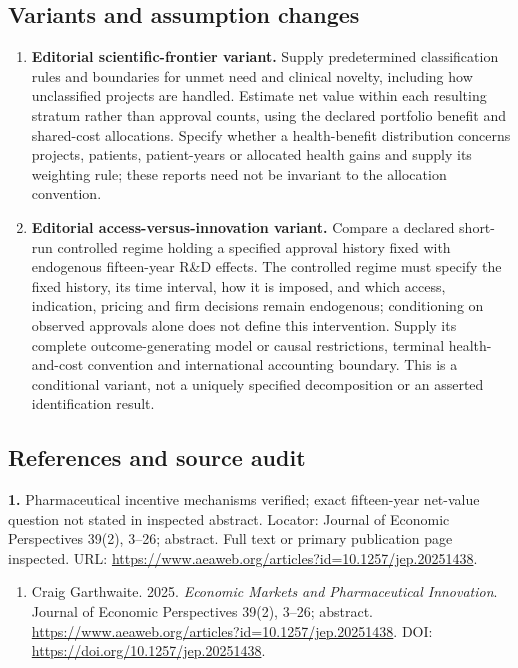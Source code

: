 \documentclass[11pt,a4paper]{article}
\begin{document}
\subsection*{Variants and assumption changes}
\begin{enumerate}
\item \textbf{Editorial scientific-frontier variant.} Supply predetermined classification rules and boundaries for unmet need and clinical novelty, including how unclassified projects are handled. Estimate net value within each resulting stratum rather than approval counts, using the declared portfolio benefit and shared-cost allocations. Specify whether a health-benefit distribution concerns projects, patients, patient-years or allocated health gains and supply its weighting rule; these reports need not be invariant to the allocation convention.
\item \textbf{Editorial access-versus-innovation variant.} Compare a declared short-run controlled regime holding a specified approval history fixed with endogenous fifteen-year R\&D effects. The controlled regime must specify the fixed history, its time interval, how it is imposed, and which access, indication, pricing and firm decisions remain endogenous; conditioning on observed approvals alone does not define this intervention. Supply its complete outcome-generating model or causal restrictions, terminal health-and-cost convention and international accounting boundary. This is a conditional variant, not a uniquely specified decomposition or an asserted identification result.
\end{enumerate}
\subsection*{References and source audit}
\textbf{1.} Pharmaceutical incentive mechanisms verified; exact fifteen-year net-value question not stated in inspected abstract. Locator: Journal of Economic Perspectives 39(2), 3–26; abstract. Full text or primary publication page inspected. URL: \url{https://www.aeaweb.org/articles?id=10.1257/jep.20251438}.
\begin{enumerate}\raggedright
\item\hypertarget{definitions:source:30007727:1}{} Craig Garthwaite. 2025. \emph{Economic Markets and Pharmaceutical Innovation}. Journal of Economic Perspectives 39(2), 3–26; abstract.
\url{https://www.aeaweb.org/articles?id=10.1257/jep.20251438}.
DOI: \url{https://doi.org/10.1257/jep.20251438}.
\end{enumerate}
\end{document}
